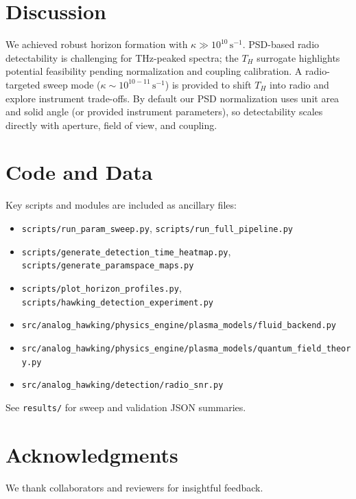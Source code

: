 \documentclass[11pt]{article}
\begin{document}
\section{Discussion}
We achieved robust horizon formation with $\kappa\gg 10^{10}\,\mathrm{s^{-1}}$. PSD-based radio detectability is challenging for THz-peaked spectra; the $T_H$ surrogate highlights potential feasibility pending normalization and coupling calibration. A radio-targeted sweep mode ($\kappa \sim 10^{10-11}\,\mathrm{s^{-1}}$) is provided to shift $T_H$ into radio and explore instrument trade-offs. By default our PSD normalization uses unit area and solid angle (or provided instrument parameters), so detectability scales directly with aperture, field of view, and coupling.

\section{Code and Data}
Key scripts and modules are included as ancillary files:
\begin{itemize}
  \item \texttt{scripts/run\_param\_sweep.py}, \texttt{scripts/run\_full\_pipeline.py}
  \item \texttt{scripts/generate\_detection\_time\_heatmap.py}, \texttt{scripts/generate\_paramspace\_maps.py}
  \item \texttt{scripts/plot\_horizon\_profiles.py}, \texttt{scripts/hawking\_detection\_experiment.py}
  \item \texttt{src/analog\_hawking/physics\_engine/plasma\_models/fluid\_backend.py}
  \item \texttt{src/analog\_hawking/physics\_engine/plasma\_models/quantum\_field\_theory.py}
  \item \texttt{src/analog\_hawking/detection/radio\_snr.py}
\end{itemize}
See \texttt{results/} for sweep and validation JSON summaries.

\section*{Acknowledgments}
We thank collaborators and reviewers for insightful feedback.



\end{document}
